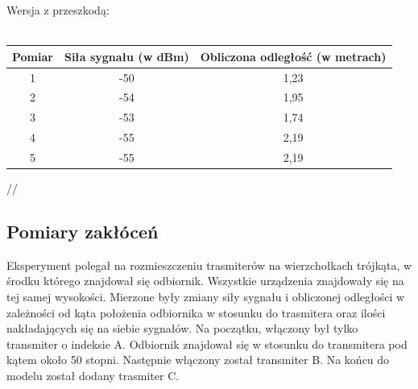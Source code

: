 \begin{itemize}
\begin{center}
\begin{minipage}{\linewidth}
		\end{minipage} 
	\end{center}
	\begin{center}
		\begin{minipage}{\linewidth}
			Wersja z przeszkodą:\\\\
			\begin{tabular}{|c|c|c|}
				\hline 
				Pomiar & Siła sygnału (w dBm) & Obliczona odległość (w metrach) \\ 
				\hline 
				1 & -50 & 1,23 \\ 
				\hline 
				2 & -54 & 1,95 \\ 
				\hline 
				3 & -53 & 1,74 \\ 
				\hline 
				4 & -55 & 2,19 \\ 
				\hline 
				5 & -55 & 2,19 \\ 
				\hline 
			\end{tabular}//
		\end{minipage} 
	\end{center}
\end{itemize}

\subsection{Pomiary zakłóceń}
Eksperyment polegał na rozmieszczeniu trasmiterów na wierzchołkach trójkąta, w środku którego znajdował się odbiornik. Wszystkie urządzenia znajdowały się na tej samej wysokości. Mierzone były zmiany siły sygnału i obliczonej odległości w zależności od kąta położenia odbiornika w stosunku do trasmitera oraz ilości nakładających się na siebie sygnałów. Na początku, włączony był tylko transmiter o indeksie A. Odbiornik znajdował się w stosunku do transmitera pod kątem około 50 stopni. Następnie włączony został transmiter B. Na końcu do modelu został dodany trasmiter C.\\

